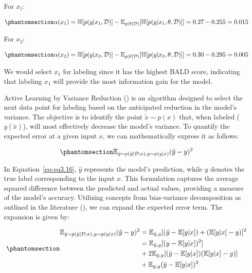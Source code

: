 \documentclass[
  letterpaper,
  numbers=noenddot,
  DIV=11]{scrreprt}
\theoremstyle{definition}
\theoremstyle{plain}
\theoremstyle{plain}
\theoremstyle{remark}
\begin{document}
For \(x_1\):

\begin{equation}\phantomsection\label{eq-eq3.14}{
\alpha(x_1) = \mathbb{H}[p(y|x_1, \mathcal{D})] - \mathbb{E}_{p(\theta|\mathcal{D})}[\mathbb{H}[p(y|x_1, \theta, \mathcal{D})]] = 0.27 - 0.255 = 0.015
}\end{equation}

For \(x_2\):

\begin{equation}\phantomsection\label{eq-eq3.15}{
\alpha(x_2) = \mathbb{H}[p(y|x_2, \mathcal{D})] - \mathbb{E}_{p(\theta|\mathcal{D})}[\mathbb{H}[p(y|x_2, \theta, \mathcal{D})]] = 0.30 - 0.295 = 0.005
}\end{equation}

We would select \(x_1\) for labeling since it has the highest BALD
score, indicating that labeling \(x_1\) will provide the most
information gain for the model.

Active Learning by Variance Reduction () is an algorithm designed to select the
next data point for labeling based on the anticipated reduction in the
model's variance. The objective is to identify the point
\(\tilde{x} \sim p(x)\) that, when labeled (\(y(\tilde{x})\)), will most
effectively decrease the model's variance. To quantify the expected
error at a given input \(x\), we can mathematically express it as
follows:

\begin{equation}\phantomsection\label{eq-eq3.16}{
\mathbb{E}_{\hat{y} \sim p(\hat{y} | \mathcal{D}; x), y \sim p(y|x)} (\hat{y} - y)^2
}\end{equation}

In Equation~\ref{eq-eq3.16}, \(\hat{y}\) represents the model's
prediction, while \(y\) denotes the true label corresponding to the
input \(x\). This formulation captures the average squared difference
between the predicted and actual values, providing a measure of the
model's accuracy. Utilizing concepts from bias-variance decomposition as
outlined in the literature
(), we can expand the expected error term. The expansion is given
by:

\begin{equation}\phantomsection\label{eq-eq3.17}{\begin{aligned}
\mathbb{E}_{\hat{y} \sim p(\hat{y} | \mathcal{D}; x), y \sim p(y|x)} (\hat{y} - y)^2 &= \mathbb{E}_{\hat{y}, y}[(\hat{y} - \mathbb{E}[y|x]) + (\mathbb{E}[y|x] - y)]^2 \\
&= \mathbb{E}_{\hat{y}, y} [(y - \mathbb{E}[y|x])^2]\\
&+ 2\mathbb{E}_{\hat{y}, y} [(\hat{y} - \mathbb{E}[y|x])(\mathbb{E}[y|x] - y)]\\
&+ \mathbb{E}_{\hat{y}, y}(\hat{y} - \mathbb{E}[y|x])^2
\end{aligned}}\end{equation}
\end{document}

